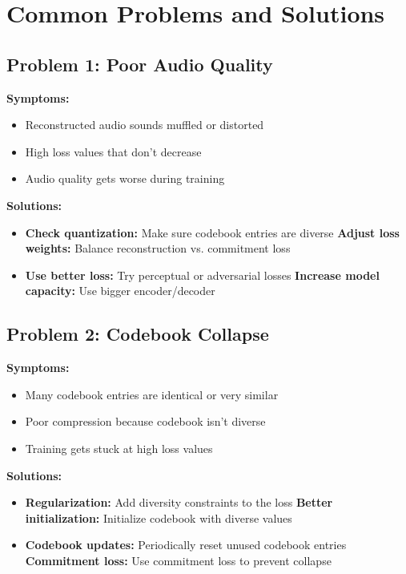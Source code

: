 \documentclass[12pt]{article}
\begin{document}
\section{Common Problems and Solutions}

\subsection{Problem 1: Poor Audio Quality}

\textbf{Symptoms:}
\begin{itemize}
    \item Reconstructed audio sounds muffled or distorted
    \item High loss values that don't decrease
    \item Audio quality gets worse during training
\end{itemize}

\textbf{Solutions:}
\begin{itemize}
    \item \textbf{Check quantization:} Make sure codebook entries are diverse
    \textbf{Adjust loss weights:} Balance reconstruction vs. commitment loss
    \item \textbf{Use better loss:} Try perceptual or adversarial losses
    \textbf{Increase model capacity:} Use bigger encoder/decoder
\end{itemize}

\subsection{Problem 2: Codebook Collapse}

\textbf{Symptoms:}
\begin{itemize}
    \item Many codebook entries are identical or very similar
    \item Poor compression because codebook isn't diverse
    \item Training gets stuck at high loss values
\end{itemize}

\textbf{Solutions:}
\begin{itemize}
    \item \textbf{Regularization:} Add diversity constraints to the loss
    \textbf{Better initialization:} Initialize codebook with diverse values
    \item \textbf{Codebook updates:} Periodically reset unused codebook entries
    \textbf{Commitment loss:} Use commitment loss to prevent collapse
\end{itemize}
\end{document}
